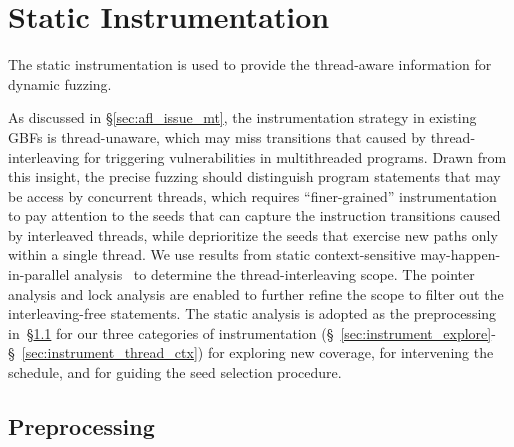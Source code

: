 \section{Static Instrumentation}\label{sec:instrument}
The static instrumentation is used to provide the thread-aware information for dynamic fuzzing.

As discussed in \S\ref{sec:afl_issue_mt}, the instrumentation strategy in existing GBFs is thread-unaware, which may miss transitions that caused by thread-interleaving for triggering vulnerabilities in multithreaded programs. Drawn from this insight, the precise fuzzing should distinguish program statements that may be access by concurrent threads, which requires ``finer-grained'' instrumentation to pay attention to the seeds that can capture the instruction transitions caused by interleaved threads, while deprioritize the seeds that exercise new paths only within a single thread.
We use results from static context-sensitive may-happen-in-parallel analysis~\cite{DBLP:conf/cgo/SuiDX16} to determine the thread-interleaving scope. The pointer analysis and lock analysis are enabled to further refine the scope to filter out the interleaving-free statements.
The static analysis is adopted as the preprocessing in~\S\ref{sec:preprocess} for our three categories of  instrumentation (\S~\ref{sec:instrument_explore}-\S~\ref{sec:instrument_thread_ctx}) for exploring new coverage, for intervening the schedule, and for guiding the seed selection procedure. 


\subsection{Preprocessing}\label{sec:preprocess}

